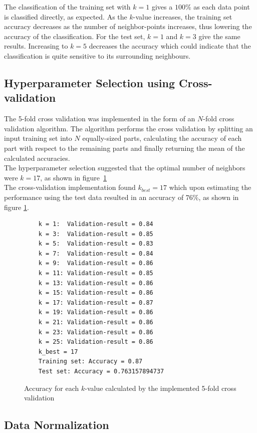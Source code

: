 \documentclass[a4paper]{article}
\begin{document}
The classification of the training set with $k=1$ gives a $100\%$ as each data point is classified directly, as expected. As the $k$-value increases, the training set accuracy decreases as the number of neighbor-points increases, thus lowering the accuracy of the classification. For the test set, $k=1$ and $k=3$ give the same results. Increasing to $k=5$ decreases the accuracy which could indicate that the classification is quite sensitive to its surrounding neighbours.


\subsection{Hyperparameter Selection using Cross-validation}
The 5-fold cross validation was implemented in the form of an $N$-fold cross validation algorithm. The algorithm performs the cross validation by splitting an input training set into $N$ equally-sized parts, calculating the accuracy of each part with respect to the remaining parts and finally returning the mean of the calculated accuracies.\\

The hyperparameter selection suggested that the optimal number of neighbors were $k = 17$, as shown in figure~\ref{fig:5-fold_results}\\

The cross-validation implementation found $k_{best} = 17$ which upon estimating the performance using the test data resulted in an accuracy of $76\%$, as shown in figure \ref{fig:5-fold_results}. 

\begin{figure}[H]
	\begin{lstlisting}
	k = 1:  Validation-result = 0.84
	k = 3:  Validation-result = 0.85
	k = 5:  Validation-result = 0.83
	k = 7:  Validation-result = 0.84
	k = 9:  Validation-result = 0.86
	k = 11: Validation-result = 0.85
	k = 13: Validation-result = 0.86
	k = 15: Validation-result = 0.86
	k = 17: Validation-result = 0.87
	k = 19: Validation-result = 0.86
	k = 21: Validation-result = 0.86
	k = 23: Validation-result = 0.86
	k = 25: Validation-result = 0.86
	k_best = 17
	Training set: Accuracy = 0.87
	Test set: Accuracy = 0.763157894737
	\end{lstlisting}
	\caption{Accuracy for each $k$-value calculated by the implemented 5-fold cross validation}
	\label{fig:5-fold_results}
\end{figure}

\subsection{Data Normalization}
\end{document}
